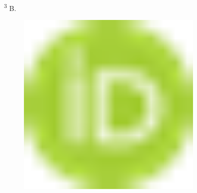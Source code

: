 \textsuperscript{3} B.
\begin{figure}[H]
	\centering
	\includegraphics[width=0.8\textwidth]{media/ict3/image1}
	\caption*{}
\end{figure}


